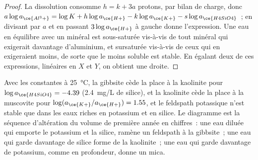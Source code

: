 \begin{proof}
La dissolution consomme $h = k + 3a$ protons, par bilan de charge, donc $a\log
a_{\ce{Al^3+}} = \log K + h\log a_{\ce{H+}} - k\log a_{\ce{K+}} - s\log
a_{\ce{H4SiO4}}$~; en divisant par $a$ et en passant $3\log a_{\ce{H+}}$ à gauche
donne l'expression. Une eau en équilibre avec un minéral est
sous-saturée vis-à-vis de tout minéral qui exigerait davantage d'aluminium, et
sursaturée vis-à-vis de ceux qui en exigeraient moins, de sorte que le moins soluble est
stable. En égalant deux de ces expressions, linéaires en $X$ et $Y$, on obtient une droite.
\end{proof}

Avec les constantes à \qty{25}{\celsius}, la gibbsite cède la place à la kaolinite pour
$\log a_{\ce{H4SiO4}} = -4.39$ (\qty{2.4}{mg/L} de silice), et la kaolinite cède la
place à la muscovite pour $\log(a_{\ce{K+}}/a_{\ce{H+}}) = 1.55$, et le feldspath potassique
n'est stable que dans les eaux riches en potassium et en silice. Le diagramme est la
séquence d'altération du volume de première année en chiffres~: une eau diluée qui
emporte le potassium et la silice, ramène un feldspath à la gibbsite~; une eau qui
garde davantage de silice forme de la kaolinite~; une eau qui garde davantage de potassium, comme en profondeur,
donne un mica.

